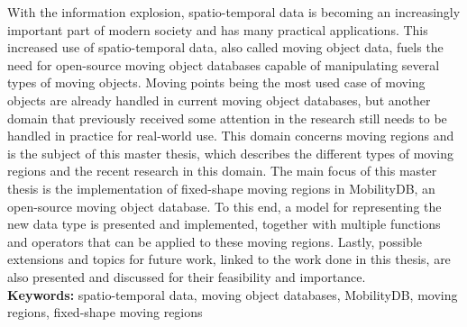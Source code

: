 With the information explosion, spatio-temporal data is becoming an increasingly important part of modern society and has many practical applications. This increased use of spatio-temporal data, also called moving object data, fuels the need for open-source moving object databases capable of manipulating several types of moving objects. Moving points being the most used case of moving objects are already handled in current moving object databases, but another domain that previously received some attention in the research still needs to be handled in practice for real-world use. This domain concerns moving regions and is the subject of this master thesis, which describes the different types of moving regions and the recent research in this domain. The main focus of this master thesis is the implementation of fixed-shape moving regions in MobilityDB, an open-source moving object database. To this end, a model for representing the new data type is presented and implemented, together with multiple functions and operators that can be applied to these moving regions. Lastly, possible extensions and topics for future work, linked to the work done in this thesis, are also presented and discussed for their feasibility and importance. \\


\noindent\textbf{Keywords:} spatio-temporal data, moving object databases, MobilityDB, moving regions, fixed-shape moving regions